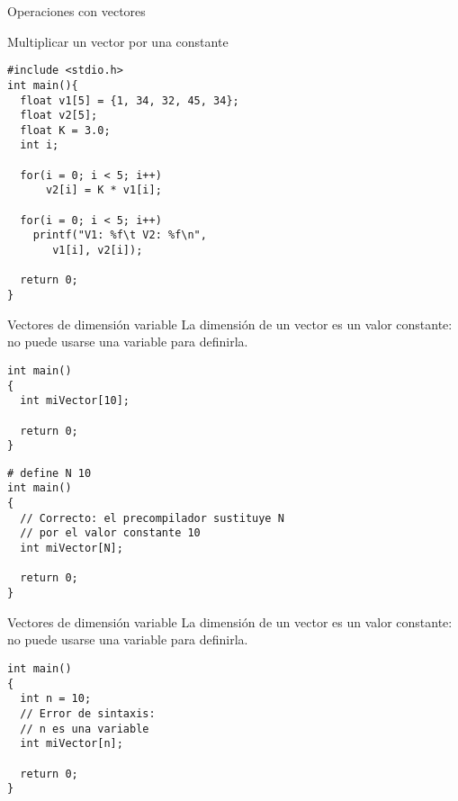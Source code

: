 \documentclass[xcolor={usenames,svgnames,dvipsnames}, aspectratio=169]{beamer}
\begin{document}
\begin{frame}[label={sec:orgf891151},fragile]{Operaciones con vectores}
 \begin{block}{Multiplicar un vector por una constante}
\lstset{language=C,label= ,caption= ,captionpos=b,numbers=none}
\begin{lstlisting}
#include <stdio.h> 
int main(){
  float v1[5] = {1, 34, 32, 45, 34};
  float v2[5];
  float K = 3.0;
  int i;
  
  for(i = 0; i < 5; i++)
      v2[i] = K * v1[i];

  for(i = 0; i < 5; i++)
    printf("V1: %f\t V2: %f\n",
	   v1[i], v2[i]);

  return 0;
}
\end{lstlisting}
\end{block}
\end{frame}


\begin{frame}[label={sec:orgdc8aa2c},fragile]{Vectores de dimensión variable}
 La dimensión de un vector es un valor constante: \alert{no puede usarse una variable} para definirla.

\lstset{language=C,label= ,caption= ,captionpos=b,numbers=none}
\begin{lstlisting}
int main()
{
  int miVector[10];

  return 0;
}
\end{lstlisting}

\lstset{language=C,label= ,caption= ,captionpos=b,numbers=none}
\begin{lstlisting}
# define N 10
int main()
{
  // Correcto: el precompilador sustituye N
  // por el valor constante 10
  int miVector[N];

  return 0;
}
\end{lstlisting}
\end{frame}

\begin{frame}[label={sec:org47c3467},fragile]{Vectores de dimensión variable}
 La dimensión de un vector es un valor constante: \alert{no puede usarse una variable} para definirla.

\lstset{language=C,label= ,caption= ,captionpos=b,numbers=none}
\begin{lstlisting}
int main()
{
  int n = 10;
  // Error de sintaxis:
  // n es una variable
  int miVector[n];

  return 0;
}
\end{lstlisting}
\end{frame}
\end{document}
